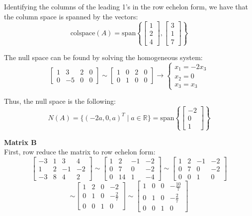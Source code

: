 \documentclass{article}
\begin{document}
\noindent Identifying the columns of the leading 1's in the row echelon form, we have that the column space is spanned by the vectors:
$$ \text{colspace}(A) = \text{span}\left\{ \begin{bmatrix} 1 \\ 2 \\ 4 \end{bmatrix}, \begin{bmatrix} 3 \\ 1 \\ 7 \end{bmatrix} \right\} $$

\noindent The null space can be found by solving the homogeneous system:
$$
\left[\begin{array}{ccc|c} 1 & 3 & 2 & 0 \\ 0 & -5 & 0 & 0 \end{array}\right]
\sim
\left[\begin{array}{ccc|c} 1 & 0 & 2 & 0 \\ 0 & 1 & 0 & 0 \end{array}\right]
\rightarrow
\begin{cases} x_1 = -2x_3 \\ x_2 = 0 \\ x_3 = x_3 \end{cases}
$$

\noindent Thus, the null space is the following:
$$
N(A) = \{(-2a, 0, a)^T \mid a \in \mathbb{R}\} = \text{span}\left\{ \begin{bmatrix} -2 \\ 0 \\ 1 \end{bmatrix} \right\}
$$

\newpage
\noindent\textbf{Matrix B} \\
First, row reduce the matrix to row echelon form:
$$
\begin{bmatrix} -3 & 1 & 3 & 4 \\ 1 & 2 & -1 & -2 \\ -3 & 8 & 4 & 2 \end{bmatrix}
\sim
\begin{bmatrix} 1 & 2 & -1 & -2 \\ 0 & 7 & 0 & -2 \\ 0 & 14 & 1 & -4 \end{bmatrix}
\sim
\begin{bmatrix} 1 & 2 & -1 & -2 \\ 0 & 7 & 0 & -2 \\ 0 & 0 & 1 & 0 \end{bmatrix}
$$ $$
\sim
\begin{bmatrix} 1 & 2 & 0 & -2 \\ 0 & 1 & 0 & -\frac{2}{7} \\ 0 & 0 & 1 & 0 \end{bmatrix}
\sim
\begin{bmatrix} 1 & 0 & 0 & -\frac{10}{7} \\ 0 & 1 & 0 & -\frac{2}{7} \\ 0 & 0 & 1 & 0 \end{bmatrix}
$$
\end{document}
